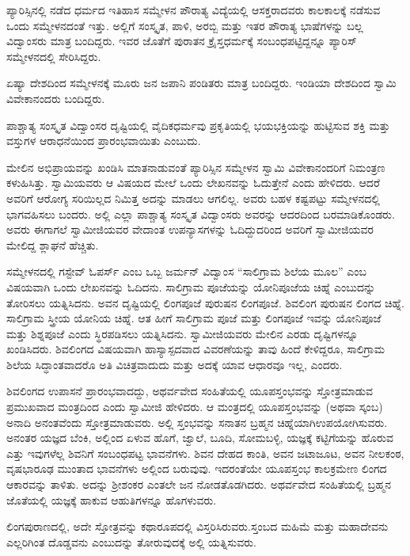  ಪ್ಯಾರಿಸ್ಸಿನಲ್ಲಿ ನಡೆದ ಧರ್ಮದ ಇತಿಹಾಸ ಸಮ್ಮೇಳನ ಪೌರಾತ್ಯ ವಿದ್ಯೆಯಲ್ಲಿ ಆಸಕ್ತರಾದವರು ಕಾಲಕಾಲಕ್ಕೆ ನಡೆಸುವ ಒಂದು ಸಮ್ಮೇಳನದಂತೆ ಇತ್ತು. ಅಲ್ಲಿಗೆ ಸಂಸ್ಕೃತ, ಪಾಳಿ, ಅರಬ್ಬಿ ಮತ್ತು ಇತರ ಪೌರಾತ್ಯ ಭಾಷೆಗಳನ್ನು ಬಲ್ಲ ವಿದ್ವಾಂಸರು ಮಾತ್ರ ಬಂದಿದ್ದರು. ಇವರ ಜೊತೆಗೆ ಪುರಾತನ ಕ್ರೈಸ್ತಧರ್ಮಕ್ಕೆ ಸಂಬಂಧಪಟ್ಟಿದ್ದನ್ನೂ ಪ್ಯಾರಿಸ್ ಸಮ್ಮೇಳನದಲ್ಲಿ ಸೇರಿಸಿದ್ದರು. 

 ಏಷ್ಯಾ ದೇಶದಿಂದ ಸಮ್ಮೇಳನಕ್ಕೆ ಮೂರು ಜನ ಜಪಾನಿ ಪಂಡಿತರು ಮಾತ್ರ ಬಂದಿದ್ದರು. ಇಂಡಿಯಾ ದೇಶದಿಂದ ಸ್ವಾಮಿ ವಿವೇಕಾನಂದರು ಬಂದಿದ್ದರು. 

 ಪಾಶ್ಚಾತ್ಯ ಸಂಸ್ಕೃತ ವಿದ್ವಾಂಸರ ದೃಷ್ಟಿಯಲ್ಲಿ ವೈದಿಕಧರ್ಮವು ಪ್ರಕೃತಿಯಲ್ಲಿ ಭಯಭಕ್ತಿಯನ್ನು ಹುಟ್ಟಿಸುವ ಶಕ್ತಿ ಮತ್ತು ವಸ್ತುಗಳ ಆರಾಧನೆಯಿಂದ ಪ್ರಾರಂಭವಾಯಿತು ಎಂಬುದು. 

 ಮೇಲಿನ ಅಭಿಪ್ರಾಯವನ್ನು ಖಂಡಿಸಿ ಮಾತನಾಡುವಂತೆ ಪ್ಯಾರಿಸ್ಸಿನ ಸಮ್ಮೇಳನ ಸ್ವಾಮಿ ವಿವೇಕಾನಂದರಿಗೆ ನಿಮಂತ್ರಣ ಕಳುಹಿಸಿತ್ತು. ಸ್ವಾಮಿಯವರು ಆ ‌ವಿಷಯದ ಮೇಲೆ ಒಂದು ಲೇಖನವನ್ನು ಓದುತ್ತೇನೆ ಎಂದು ಹೇಳಿದರು. ಆದರೆ ಅವರಿಗೆ ಆರೋಗ್ಯ ಸರಿಯಿಲ್ಲದ ನಿಮಿತ್ತ ಅದನ್ನು ಮಾಡಲು ಆಗಲಿಲ್ಲ. ಅವರು ಬಹಳ ಕಷ್ಟಪಟ್ಟು ಸಮ್ಮೇಳನದಲ್ಲಿ ಭಾಗವಹಿಸಲು ಬಂದರು. ಅಲ್ಲಿ ಎಲ್ಲಾ ಪಾಶ್ಚಾತ್ಯ ಸಂಸ್ಕೃತ ವಿದ್ವಾಂಸರು ಅವರನ್ನು ಆದರದಿಂದ ಬರಮಾಡಿಕೊಂಡರು. ಅವರು ಈಗಾಗಲೆ ಸ್ವಾಮೀಜಿಯವರ ವೇದಾಂತ ಉಪನ್ಯಾಸಗಳನ್ನು ಓದಿದ್ದುದರಿಂದ ಅವರಿಗೆ ಸ್ವಾಮೀಜಿಯವರ ಮೇಲಿದ್ದ ಶ್ಲಾಘನೆ ಹೆಚ್ಚಿತು. 

 ಸಮ್ಮೇಳನದಲ್ಲಿ ಗಸ್ಟೇವ್ ಓಪರ್ಸ್ ಎಂಬ ಒಬ್ಬ ಜರ್ಮನ್ ವಿದ್ವಾಂಸ “ಸಾಲಿಗ್ರಾಮ ಶಿಲೆಯ ಮೂಲ” ಎಂಬ ವಿಷಯವಾಗಿ ಒಂದು ಲೇಖನವನ್ನು ಓದಿದನು. ಸಾಲಿಗ್ರಾಮ ಪೂಜೆಯನ್ನು ಯೋನಿಪೂಜೆಯ ಚಿಹ್ನೆ ಎಂಬುದನ್ನು ತೋರಿಸಲು ಯತ್ನಿಸಿದನು. ಅವನ ದೃಷ್ಟಿಯಲ್ಲಿ ಲಿಂಗಪೂಜೆ ಪುರುಷನ ಲಿಂಗಪೂಜೆ. ಶಿವಲಿಂಗ ಪುರುಷನ ಲಿಂಗದ ಚಿಹ್ನೆ. ಸಾಲಿಗ್ರಾಮ ಸ್ತ್ರೀಯ ಯೋನಿಯ ಚಿಹ್ನೆ. ಆತ ಹೀಗೆ ಸಾಲಿಗ್ರಾಮ ಪೂಜೆ ಮತ್ತು ಲಿಂಗಪೂಜೆ ಇವನ್ನು ಯೋನಿಪೂಜೆ ಮತ್ತು ಶಿಶ್ನಪೂಜೆ ಎಂದು ಸ್ಥಿರಪಡಿಸಲು ಯತ್ನಿಸಿದನು. ಸ್ವಾಮೀಜಿಯವರು ಮೇಲಿನ ಎರಡು ದೃಷ್ಟಿಗಳನ್ನೂ ಖಂಡಿಸಿದರು. ಶಿವಲಿಂಗದ ವಿಷಯವಾಗಿ ಹಾಸ್ಯಾಸ್ಪದವಾದ ವಿವರಣೆಯನ್ನು ತಾವು ಹಿಂದೆ ಕೇಳಿದ್ದರೂ, ಸಾಲಿಗ್ರಾಮ ಶಿಲೆಯ ಸಿದ್ಧಾಂತವಾದರೊ ಅತಿ ವಿಚಿತ್ರವಾದುದು ಮತ್ತು ಅದಕ್ಕೆ ಯಾವ ಆಧಾರವೂ ಇಲ್ಲ, ಎಂದರು. 

 ಶಿವಲಿಂಗದ ಉಪಾಸನೆ ಪ್ರಾರಂಭವಾದದ್ದು, ಅಥರ್ವವೇದ ಸಂಹಿತೆಯಲ್ಲಿ \break ಯೂಪಸ್ತಂಭವನ್ನು ಸ್ತೋತ್ರಮಾಡುವ ಪ್ರಮುಖವಾದ ಮಂತ್ರದಿಂದ ಎಂದು ಸ್ವಾಮೀಜಿ ಹೇಳಿದರು. ಆ ಮಂತ್ರದಲ್ಲಿ ಯೂಪಸ್ತಂಭವನ್ನು (ಅಥವಾ ಸ್ಕಂಬ) ಅನಾದಿ ಅನಂತವೆಂದು ಸ್ತೋತ್ರಮಾಡುವರು. ಅಲ್ಲಿ ಸ್ತಂಭವನ್ನು ಸನಾತನ ಬ್ರಹ್ಮನ ಚಿಹ್ನೆಯಾಗಿ\break ಉಪಯೋಗಿಸುವರು. ಅನಂತರ ಯಜ್ಞದ ಬೆಂಕಿ, ಅಲ್ಲಿಂದ ಏಳುವ ಹೊಗೆ, ಜ್ವಾಲೆ, ಬೂದಿ, ಸೋಮಬಳ್ಳಿ, ಯಜ್ಞಕ್ಕೆ ಕಟ್ಟಿಗೆಯನ್ನು ಹೊರುವ ಎತ್ತು ಇವುಗಳೆಲ್ಲ ಶಿವನಿಗೆ ಸಂಬಂಧಪಟ್ಟ ಭಾವನೆಗಳು. ಶಿವನ ದೇಹದ ಕಾಂತಿ, ಅವನ ಜಟಾಜೂಟ, ಅವನ ನೀಲಕಂಠ, ವೃಷಭಾರೂಢ ಮುಂತಾದ ಭಾವನೆಗಳು ಅಲ್ಲಿಂದ ಬರುವುವು. ಇದರಂತೆಯೇ ಯೂಪಸ್ತಂಭ ಕಾಲಕ್ರಮೇಣ ಲಿಂಗದ ಆಕಾರವನ್ನು ತಾಳಿತು. ಅದನ್ನು ಶ‍್ರೀಶಂಕರ ಎಂತಲೇ ಜನ ನೋಡತೊಡಗಿದರು. ಅಥರ್ವವೇದ ಸಂಹಿತೆಯಲ್ಲಿ ಬ್ರಹ್ಮನ ಜೊತೆಯಲ್ಲಿ ಯಜ್ಞಕ್ಕೆ ಹಾಕುವ ಆಹುತಿಗಳನ್ನೂ ಹೊಗಳುವರು. 

 ಲಿಂಗಪುರಾಣದಲ್ಲಿ, ಅದೇ ಸ್ತೋತ್ರವನ್ನು ಕಥಾರೂಪದಲ್ಲಿ ವಿಸ್ತರಿಸಿರುವರು.\break ಸ್ತಂಬದ ಮಹಿಮೆ ಮತ್ತು ಮಹಾದೇವನು ಎಲ್ಲರಿಗಿಂತ ದೊಡ್ಡವನು ಎಂಬುದನ್ನು ತೋರುವುದಕ್ಕೆ ಅಲ್ಲಿ ಯತ್ನಿಸುವರು. 

